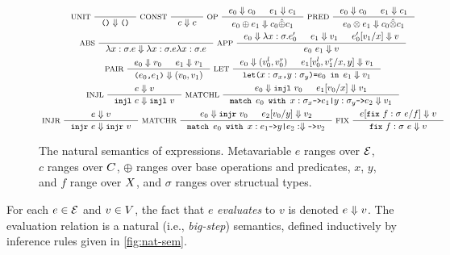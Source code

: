 \begin{figure}
  \centering
  \begin{gather*}
  \inference[ UNIT ]{ }{ \unit \evalsto \unit } 
  \inference[ CONST ]{ }{ c \evalsto c } 
  \inference[ OP ]{ %
    e_0 \evalsto c_0 & %
    e_1 \evalsto c_1 }{ %
    e_0 \oplus e_1 \evalsto c_0 \interp{\oplus} c_1 } 
  \inference[ PRED ]{ %
    e_0 \evalsto c_0 & %
    e_1 \evalsto c_1 }{ %
    e_0 \otimes e_1 \evalsto c_0 \interp{\otimes} c_1 } \\
  \inference[ ABS ]{ }{ \abs{ x }{ \sigma }{ e } \evalsto %
    \abs{ x }{ \sigma }{ e } \abs{x}{\sigma}{e} } 
  \inference[ APP ]{ %
    e_0 \evalsto \abs{x}{\sigma}{e_0'} & %
    e_1 \evalsto v_1 &
    \replace{ e_0' }{ x }{ v_1 } \evalsto v }{ %
    e_0\ e_1 \evalsto v } \\
  \inference[ PAIR ]{ %
    e_0 \evalsto v_0 & e_1 \evalsto v_1 }{ %
    \pair{ e_0 }{ e_1 } \evalsto (v_0, v_1) } 
  \inference[ LET ]{
    e_0 \evalsto (v_0^l, v_0^r) &
    \replace{ e_1 }{ x, y }{ v_0^l, v_1^r } \evalsto v_1 }{ %
    \letexp{x}{\sigma_x}{y}{\sigma_y}{e_0}{e_1} \evalsto v_1 } \\
  \inference[ INJL ]{ e \evalsto v }{ %
    \injl\ e \evalsto \injl\ v } 
  \inference[ MATCHL ]{
    e_0 \evalsto \injl\ v_0 & %
    \replace{ e_1 }{ x }{ v_0 } \evalsto v_1 }{ %
    \matchexp{ e_0 }{ x }{\sigma_x}{ e_1 }{ y }{\sigma_y}{ e_2 } \evalsto v_1 } \\
  \inference[ INJR ]{ e \evalsto v }{ \injr\ e \evalsto \injr\ v }
  \inference[ MATCHR ]{
    e_0 \evalsto \injr\ v_0 &
    \replace{ e_2 }{ y }{ v_0 } \evalsto v_2 }{ %
    \matchexp{ e_0 }{ x }{ e_1 }{ y }{ e_2 } \evalsto v_2 } 
  \inference[ FIX ]{ \replace{e}{ f }{ \fix{ f }{\sigma}{ e } } \evalsto v } %
  { \fix{ f }{\sigma}{ e } \evalsto v }
  \end{gather*}
  \caption{The natural semantics of expressions.
    Metavariable $e$ ranges over $\mathcal{E}$, %
    $c$ ranges over $C$, %
    $\oplus$ ranges over base operations and predicates, %
    $x$, $y$, and $f$ range over $X$, and
    $\sigma$ ranges over structual types.}
  \label{fig:nat-sem}
\end{figure}
%
For each $e \in \mathcal{E}$ and $v \in V$, the fact that $e$
\emph{evaluates} to $v$ is denoted $e \Downarrow v$.
% 
The evaluation relation is a natural (i.e., \emph{big-step})
semantics, defined inductively by inference rules given in
\autoref{fig:nat-sem}.


